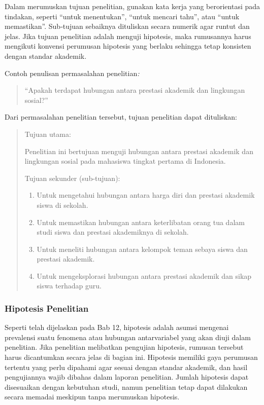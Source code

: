 \documentclass[
  indonesian,
  letterpaper,
  DIV=11,
  numbers=noendperiod]{scrreprt}
\providecommand{\tightlist}{%
  \setlength{\itemsep}{0pt}\setlength{\parskip}{0pt}}
\begin{document}
Dalam merumuskan tujuan penelitian, gunakan kata kerja yang berorientasi
pada tindakan, seperti ``untuk menentukan'', ``untuk mencari tahu'',
atau ``untuk memastikan''. Sub‑tujuan sebaiknya dituliskan secara
numerik agar runtut dan jelas. Jika tujuan penelitian adalah menguji
hipotesis, maka rumusannya harus mengikuti konvensi perumusan hipotesis
yang berlaku sehingga tetap konsisten dengan standar akademik.

Contoh penulisan permasalahan penelitian\emph{:}

\begin{quote}
``Apakah terdapat hubungan antara prestasi akademik dan lingkungan
sosial?''
\end{quote}

Dari permasalahan penelitian tersebut, tujuan penelitian dapat
dituliskan:

\begin{quote}
Tujuan utama:

Penelitian ini bertujuan menguji hubungan antara prestasi akademik dan
lingkungan sosial pada mahasiswa tingkat pertama di Indonesia.

Tujuan sekunder (sub-tujuan):

\begin{enumerate}
\def\labelenumi{\arabic{enumi}.}
\tightlist
\item
  Untuk mengetahui hubungan antara harga diri dan prestasi akademik
  siswa di sekolah.
\item
  Untuk memastikan hubungan antara keterlibatan orang tua dalam studi
  siswa dan prestasi akademiknya di sekolah.
\item
  Untuk meneliti hubungan antara kelompok teman sebaya siswa dan
  prestasi akademik.
\item
  Untuk mengeksplorasi hubungan antara prestasi akademik dan sikap siswa
  terhadap guru.
\end{enumerate}
\end{quote}

\subsubsection{Hipotesis Penelitian}\label{hipotesis-penelitian-1}

Seperti telah dijelaskan pada Bab 12, hipotesis adalah asumsi mengenai
prevalensi suatu fenomena atau hubungan antarvariabel yang akan diuji
dalam penelitian. Jika penelitian melibatkan pengujian hipotesis,
rumusan tersebut harus dicantumkan secara jelas di bagian ini. Hipotesis
memiliki gaya perumusan tertentu yang perlu dipahami agar sesuai dengan
standar akademik, dan hasil pengujiannya wajib dibahas dalam laporan
penelitian. Jumlah hipotesis dapat disesuaikan dengan kebutuhan studi,
namun penelitian tetap dapat dilakukan secara memadai meskipun tanpa
merumuskan hipotesis.
\end{document}
